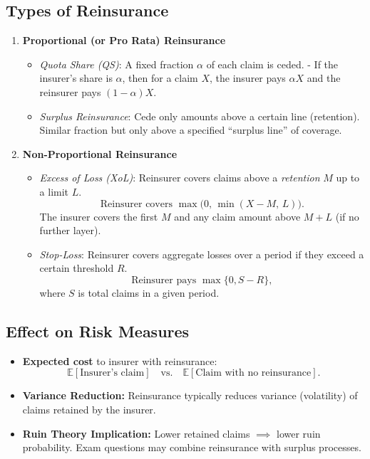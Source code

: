 \documentclass[13pt,a4paper]{article}
\begin{document}
\subsection{Types of Reinsurance}
\begin{enumerate}
  \item \textbf{Proportional (or Pro Rata) Reinsurance}
  \begin{itemize}
    \item \emph{Quota Share (QS)}: A fixed fraction \(\alpha\) of each claim is ceded.  
      - If the insurer’s share is \(\alpha\), then for a claim \(X\), the insurer pays \(\alpha X\) and the reinsurer pays \((1-\alpha)X\).
    \item \emph{Surplus Reinsurance}: Cede only amounts above a certain line (retention). Similar fraction but only above a specified “surplus line” of coverage. 
  \end{itemize}

  \item \textbf{Non-Proportional Reinsurance}
  \begin{itemize}
    \item \emph{Excess of Loss (XoL)}: Reinsurer covers claims above a \emph{retention} \(M\) up to a limit \(L\). 
      \[
        \text{Reinsurer covers } \max\bigl(0,\, \min(X - M,\, L)\bigr).
      \]
      The insurer covers the first \(M\) and any claim amount above \(M+L\) (if no further layer).
    \item \emph{Stop-Loss}: Reinsurer covers aggregate losses over a period if they exceed a certain threshold \(R\). 
      \[
        \text{Reinsurer pays } \max\{0, S - R\},
      \]
      where \(S\) is total claims in a given period.
  \end{itemize}
\end{enumerate}

\subsection{Effect on Risk Measures}
\begin{itemize}
  \item \textbf{Expected cost} to insurer with reinsurance:
    \[
      \mathbb{E}[\text{Insurer’s claim}]\quad \text{vs.}\quad \mathbb{E}[\text{Claim with no reinsurance}].
    \]
  \item \textbf{Variance Reduction:} Reinsurance typically reduces variance (volatility) of claims retained by the insurer.
  \item \textbf{Ruin Theory Implication:} Lower retained claims \(\implies\) lower ruin probability. Exam questions may combine reinsurance with surplus processes.
\end{itemize}
\end{document}
